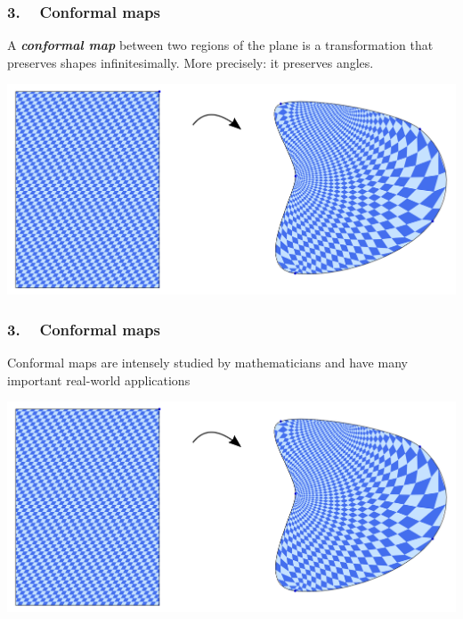 
\begin{frame}
\frametitle{3. ~ Conformal maps}

A \emph{\bfseries conformal map} between two regions of the plane is a transformation that preserves shapes infinitesimally.
More precisely: it preserves angles.

\bigskip
\pause

\begin{center}
\includegraphics[width=\textwidth]{images/Conf1.pdf}
\end{center}

\end{frame}




\begin{frame}
\frametitle{3. ~ Conformal maps}

Conformal maps are intensely studied by mathematicians and have many important real-world applications

\bigskip
\pause

\begin{center}
\includegraphics[width=\textwidth]{images/Conf1.pdf}
\end{center}

\end{frame}
